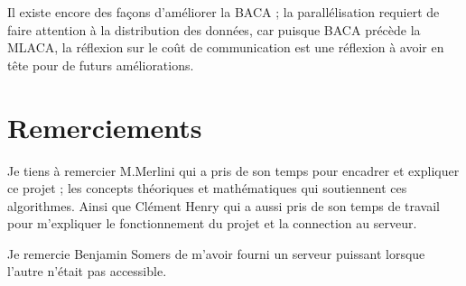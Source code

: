 \documentclass[10pt]{SelfArx} %
\begin{document}
Il existe encore des façons d'améliorer la BACA ; la parallélisation requiert de faire attention à la distribution des données, car puisque BACA précède la MLACA, la réflexion sur le coût de communication est une réflexion à avoir en tête pour de futurs améliorations.


\section*{Remerciements} %


Je tiens à remercier M.Merlini qui a pris de son temps pour encadrer et expliquer ce projet ; les concepts théoriques et mathématiques qui soutiennent ces algorithmes. Ainsi que Clément Henry qui a aussi pris de son temps de travail pour m'expliquer le fonctionnement du projet et la connection au serveur.

Je remercie Benjamin Somers de m'avoir fourni un serveur puissant lorsque l'autre n'était pas accessible.





\end{document}
